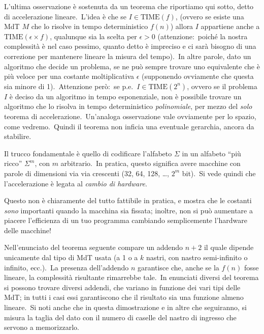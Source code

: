 \noindent L'ultima osservazione è sostenuta da un teorema che riportiamo qui sotto, detto di accelerazione lineare.\
L'idea è che se $I \in \mathrm{TIME}(f)$, (ovvero se esiste una MdT $M$ che lo risolve in tempo deterministico $f(n)$) allora $I$ appartiene anche a $\mathrm{TIME}(\epsilon \times f)$, qualunque sia la scelta per $\epsilon > 0$ (attenzione:\ poiché la nostra complessità è nel caso pessimo, quanto detto è impreciso e ci sarà bisogno di una correzione per mantenere lineare la misura del tempo).\
In altre parole, dato un algoritmo che decide un problema, se ne può sempre trovare uno equivalente che è più veloce per una costante moltiplicativa $\epsilon$ (supponendo ovviamente che questa sia minore di 1).\
Attenzione però:\ se p.e.\ $I \in \mathrm{TIME}(2^n)$, ovvero se il problema $I$ è deciso da un algoritmo in tempo esponenziale, non è possibile trovare un algoritmo che lo risolva in tempo deterministico \textit{polinomiale}, per mezzo del \textit{solo} teorema di accelerazione.\
Un'analoga osservazione vale ovviamente per lo spazio, come vedremo.\
Quindi il teorema non inficia una eventuale gerarchia, ancora da stabilire.

Il trucco fondamentale è quello di codificare l'alfabeto $\Sigma$ in un alfabeto ``più ricco'' $\Sigma^m$, con $m$ arbitrario.\
In pratica, questo significa avere macchine con parole di dimensioni via via crescenti (32, 64, 128, \dots, $2^m$ bit).\
Si vede quindi che l'accelerazione è legata al \textit{cambio di hardware}.

Questo non è chiaramente del tutto fattibile in pratica, e mostra che le costanti \textit{sono} importanti quando la macchina sia fissata; inoltre, non si può aumentare a piacere l'efficienza di un tuo programma cambiando semplicemente l'hardware delle macchine!

Nell'enunciato del teorema seguente compare un addendo $n + 2$ il quale dipende unicamente dal tipo di MdT usata (a 1 o a $k$ nastri, con nastro semi-infinito o infinito, ecc.).\
La presenza dell'addendo $n$ garantisce che, anche se la $f(n)$ fosse lineare, la complessità risultante rimarrebbe tale.\
In enunciati diversi del teorema si possono trovare diversi addendi, che variano in funzione dei vari tipi delle MdT; in tutti i casi essi garantiscono che il risultato sia una funzione almeno lineare.\
Si noti anche che in questa dimostrazione e in altre che seguiranno, si misura la taglia del dato con il numero di caselle del nastro di ingresso che servono a memorizzarlo.\


